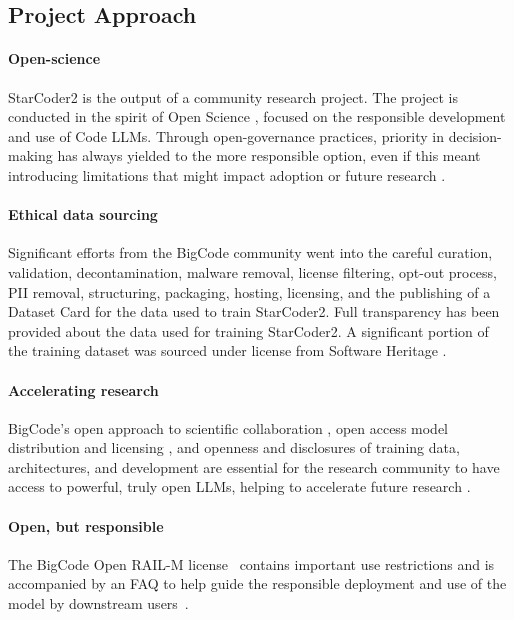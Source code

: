 \documentclass[10pt]{article} %
\begin{document}
\subsection{Project Approach}

\paragraph{Open-science} StarCoder2 is the output of a community research project. The project is conducted in the spirit of Open Science \citep{Woelfle2011OpenSI, mendez2020openscience}, focused on the responsible development and use of Code LLMs. Through open-governance practices, priority in decision-making has always yielded to the more responsible option, even if this meant introducing limitations that might impact adoption or future research \citep{bigcodecollaboration2023bigcode}. 

\paragraph{Ethical data sourcing} Significant efforts from the BigCode community went into the careful curation, validation, decontamination, malware removal, license filtering, opt-out process, PII removal, structuring, packaging, hosting, licensing, and the publishing of a Dataset Card \citep{bigcode2024thestackv2} for the data used to train StarCoder2.  Full transparency has been provided about the data used for training StarCoder2. A significant portion of the training dataset was sourced under license from Software Heritage \citep{softwareheritage2024bulk}.

\paragraph{Accelerating research} BigCode's open approach to scientific collaboration \citep{bigcodecollaboration2023bigcode}, open access model distribution and licensing \citep{bigcode2023modellicense, lamalfa2023language}, and openness and disclosures of training data, architectures, and development are essential for the research community to have access to powerful, truly open LLMs, helping to accelerate future research \citep{groeneveld2024olmo,xu2024lemur,soldaini2024dolma,singh2024aya,ustun2024aya,luukkonen2023fingpt,Woelfle2011OpenSI}.

\paragraph{Open, but responsible} The BigCode Open RAIL-M license~\citep{bigcode2023modellicense} contains important use restrictions and is accompanied by an FAQ to help guide the responsible deployment and use of the model by downstream users~\citep{bigcode2023openrailfaq}.
\end{document}
